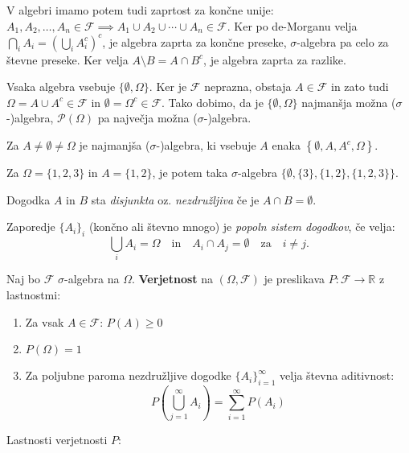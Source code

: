 \documentclass[12pt]{book}
\def\n{\noindent}
\theoremstyle{definition}
\theoremstyle{plain}
\theoremstyle{plain}
\theoremstyle{plain}
\theoremstyle{remark}
\begin{document}
V algebri imamo potem tudi zaprtost za končne unije: $A_1, A_2, \ldots, A_n \in \mathcal{F} \implies A_1 \cup A_2 \cup \cdots \cup A_n \in \mathcal{F}$. Ker po de-Morganu velja $\bigcap_i A_i=\left(\bigcup_i A_i^c\right)^c$, je algebra zaprta za končne preseke, $\sigma$-algebra pa celo za števne preseke. Ker velja $A \setminus B=A \cap B^c$, je algebra zaprta za razlike. 

Vsaka algebra vsebuje $\{\emptyset, \Omega\}$. Ker je $\mathcal{F}$ neprazna, obstaja $A \in \mathcal{F}$ in zato tudi $\Omega=A \cup A^c \in \mathcal{F}$ in $\emptyset=\Omega^c \in \mathcal{F}$. Tako dobimo, da je $\{\emptyset, \Omega\}$ najmanšja možna ($\sigma$-)algebra, $\mathcal{P}(\Omega)$ pa največja možna ($\sigma$-)algebra.

\begin{zgled}
    Za $A \neq \emptyset \neq \Omega$ je najmanjša ($\sigma$-)algebra, ki vsebuje $A$ enaka $\left\{\emptyset, A, A^c, \Omega\right\}$. 

    \n Za $\Omega=\{1,2,3\}$ in $A=\{1,2\}$, je potem taka $\sigma$-algebra $\{\emptyset,\{3\},\{1,2\},\{1,2,3\}\}$.
\end{zgled}

Dogodka $A$ in $B$ sta \emph{disjunkta} oz. \emph{nezdružljiva} če je $A \cap B=\emptyset$. 

Zaporedje $\{A_i\}_i$ (končno ali števno mnogo) je \emph{popoln sistem dogodkov}, če velja: $$\bigcup_i A_i=\Omega \quad \text{in} \quad A_i \cap A_j = \emptyset \quad \text{za} \quad i \neq j.$$ 

\n Naj bo $\mathcal{F}$ $\sigma$-algebra na $\Omega$. \textbf{Verjetnost} na $(\Omega, \mathcal{F})$ je preslikava $P:\mathcal{F} \to \mathbb{R}$ z lastnostmi:

\begin{enumerate}
    \item Za vsak $A \in \mathcal{F}$: $P(A) \geq 0 $
    \item $P(\Omega) = 1$
    \item Za poljubne paroma nezdružljive dogodke $\{A_i\}_{i=1}^{\infty}$ velja števna aditivnost: $$P\left(\bigcup_{j=1}^{\infty} A_i\right)=\sum_{i=1}^{\infty} P\left(A_i\right)$$
\end{enumerate}

\n Lastnosti verjetnosti $P$: 
\end{document}
